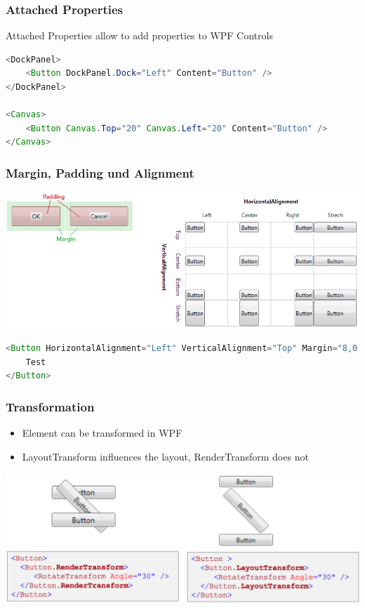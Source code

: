 \documentclass[10pt]{article}
\begin{document}
\subsubsection{Attached Properties}
Attached Properties allow to add properties to WPF Controls
\begin{lstlisting}[language=Java, caption=Attached Properties, style=JavaStyle]
<DockPanel>
	<Button DockPanel.Dock="Left" Content="Button" />
</DockPanel>

<Canvas>
	<Button Canvas.Top="20" Canvas.Left="20" Content="Button" />
</Canvas>
\end{lstlisting}
\subsubsection{Margin, Padding und Alignment}
\begin{center}
	\includegraphics[scale=0.4]{xaml_alignement.png}
\end{center}
\begin{lstlisting}[language=Java, caption=Alignment, style=JavaStyle]
<Button HorizontalAlignment="Left" VerticalAlignment="Top" Margin="8,0,8,8" >
    Test
</Button>
\end{lstlisting}
\subsubsection{Transformation}
\begin{itemize}
	\item Element can be transformed in WPF
	\item LayoutTransform influences the layout, RenderTransform does not
\end{itemize}
\begin{center}
	\includegraphics[scale=0.4]{xaml_rendering.png}
\end{center}
\end{document}
